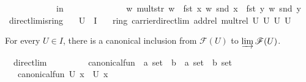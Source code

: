 \documentclass[12pt]{scrartcl}
\begin{document}
\begin{isabelle}
\ \ \ \ \ \ \ \ \ \ \ \ in\isanewline
\ \ \ \ \ \ \ \ \ \ \ \ \ \ {\isasymlfloor}w{\isacharcomma}{\kern0pt}\ mult{\isacharunderscore}{\kern0pt}str\ w\ {\isacharparenleft}{\kern0pt}{\isasymrho}\ {\isacharparenleft}{\kern0pt}fst\ x{\isacharparenright}{\kern0pt}\ w\ {\isacharparenleft}{\kern0pt}snd\ x{\isacharparenright}{\kern0pt}{\isacharparenright}{\kern0pt}\ {\isacharparenleft}{\kern0pt}{\isasymrho}\ {\isacharparenleft}{\kern0pt}fst\ y{\isacharparenright}{\kern0pt}\ w\ {\isacharparenleft}{\kern0pt}snd\ y{\isacharparenright}{\kern0pt}{\isacharparenright}{\kern0pt}{\isasymrfloor}{\isachardoublequoteclose}\isanewline
\isanewline
{}\isamarkupfalse%
\ direct{\isacharunderscore}{\kern0pt}{lim}{\isacharunderscore}{\kern0pt}{is}{\isacharunderscore}{\kern0pt}{ring}{\isacharcolon}{\kern0pt}\isanewline
\ \ \ {\isachardoublequoteopen}U\ {\isasymin}\ I{\isachardoublequoteclose}\isanewline
\ \ \ {\isachardoublequoteopen}ring\ carrier{\isacharunderscore}{\kern0pt}direct{\isacharunderscore}{\kern0pt}lim\ add{\isacharunderscore}{\kern0pt}rel\ mult{\isacharunderscore}{\kern0pt}rel\ {\isasymlfloor}U{\isacharcomma}{\kern0pt}\ {\isasymzero}\isactrlbsub U\isactrlesub {\isasymrfloor}\ {\isasymlfloor}U{\isacharcomma}{\kern0pt}\ {\isasymone}\isactrlbsub U\isactrlesub {\isasymrfloor}{\isachardoublequoteclose}\isanewline
\isanewline
{}
\end{isabelle}

For every $U \in I$, there is a canonical inclusion from $\mathscr{F}(U)$ to $\varinjlim \mathscr{F}(U)$. 

\begin{isabelle}
\isamarkupfalse%
\ {\isacharparenleft}{\kern0pt}\ direct{\isacharunderscore}{\kern0pt}lim{\isacharparenright}{\kern0pt}\ \isanewline
\ \ \ \ \ \ \ \ canonical{\isacharunderscore}{\kern0pt}fun\ {\isacharcolon}{\kern0pt}{\isacharcolon}{\kern0pt}\ {\isachardoublequoteopen}{\isacharprime}{\kern0pt}a\ set\ {\isasymRightarrow}\ {\isacharprime}{\kern0pt}b\ {\isasymRightarrow}\ {\isacharparenleft}{\kern0pt}{\isacharprime}{\kern0pt}a\ set\ {\isasymtimes}\ {\isacharprime}{\kern0pt}b{\isacharparenright}{\kern0pt}\ set{\isachardoublequoteclose}\isanewline
\ \ \ {\isachardoublequoteopen}canonical{\isacharunderscore}{\kern0pt}fun\ U\ x\ {\isacharequal}{\kern0pt}\ {\isasymlfloor}U{\isacharcomma}{\kern0pt}\ x{\isasymrfloor}{\isachardoublequoteclose}
\end{isabelle}
\end{document}
